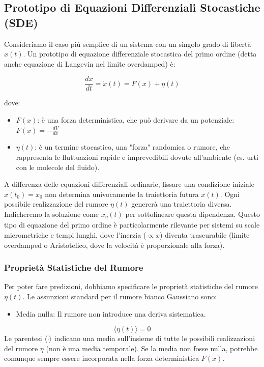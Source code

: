 \subsection{Prototipo di Equazioni Differenziali Stocastiche (SDE)}
Consideriamo il caso più semplice di un sistema con un singolo grado di libertà $x(t)$. Un prototipo di equazione differenziale stocastica del primo ordine (detta anche equazione di Langevin nel limite overdamped) è:

\begin{equation}
\label{eq:sde_1}
\frac{dx}{dt} = \dot{x}(t) = F(x) + \eta(t)
\end{equation}

dove:
\begin{itemize}
    \item $F(x)$: è una forza deterministica, che può derivare da un potenziale: $F(x) = -\frac{dV}{dx}$
    \item $\eta(t)$: è un termine stocastico, una "forza" randomica o rumore, che rappresenta le fluttuazioni rapide e imprevedibili dovute all'ambiente (es. urti con le molecole del fluido).
\end{itemize}

A differenza delle equazioni differenziali ordinarie, fissare una condizione iniziale $x(t_0) = x_0$ non determina univocamente la traiettoria futura $x(t)$. Ogni possibile realizzazione del rumore $\eta(t)$ genererà una traiettoria diversa.
Indicheremo la soluzione come $x_\eta(t)$ per sottolineare questa dipendenza.
Questo tipo di equazione del primo ordine è particolarmente rilevante per sistemi su scale micrometriche e tempi lunghi, dove l'inerzia ($\propto \ddot{x}$) diventa trascurabile (limite overdamped o Aristotelico, dove la velocità è proporzionale alla forza).

\subsubsection{Proprietà Statistiche del Rumore}
Per poter fare predizioni, dobbiamo specificare le proprietà statistiche del rumore $\eta(t)$. Le assunzioni standard per il rumore bianco Gaussiano sono:

\begin{itemize}
    \item Media nulla: Il rumore non introduce una deriva sistematica.
\end{itemize}
\begin{equation}
\langle \eta(t) \rangle = 0
\end{equation}
Le parentesi $\langle \cdot \rangle$ indicano una media sull'insieme di tutte le possibili realizzazioni del rumore $\eta$ (non è una media temporale). Se la media non fosse nulla, potrebbe comunque sempre essere incorporata nella forza deterministica $F(x)$.

